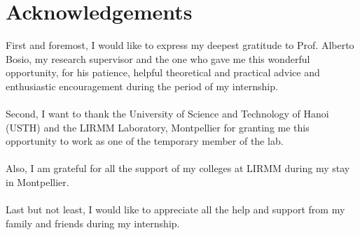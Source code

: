 \chapter*{Acknowledgements}

First and foremost, I would like to express my deepest gratitude to Prof. Alberto Bosio, my research supervisor and the one who gave me this wonderful opportunity, for his patience, helpful theoretical and practical advice and enthusiastic encouragement during the period of my internship. \\
~\\
Second, I want to thank the University of Science and Technology of Hanoi (USTH) and the LIRMM Laboratory, Montpellier for granting me this opportunity to work as one of the temporary member of the lab. \\
~\\
Also, I am grateful for all the support of my colleges at LIRMM during my stay in Montpellier. \\
~\\
Last but not least, I would like to appreciate all the help and support from my family and friends during my internship. \\